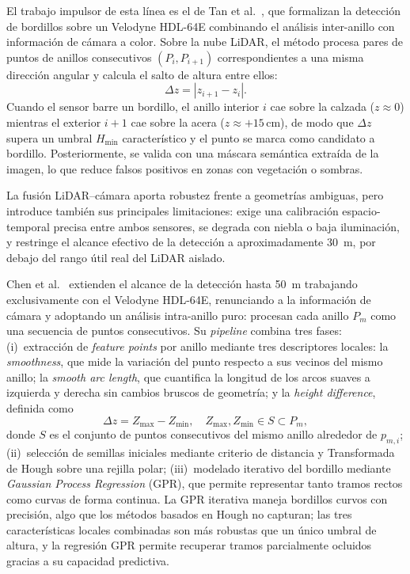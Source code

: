 El trabajo impulsor de esta línea es el de Tan et
al.~\cite{tan2014curb}, que formalizan la detección de bordillos sobre
un Velodyne HDL-64E combinando el análisis inter-anillo con información
de cámara a color. Sobre la nube LiDAR, el método procesa pares de
puntos de anillos consecutivos $(P_i, P_{i+1})$ correspondientes a una
misma dirección angular y calcula el salto de altura entre ellos:
\begin{equation}
    \Delta z = \left| z_{i+1} - z_i \right|.
\end{equation}
Cuando el sensor barre un bordillo, el anillo interior $i$ cae sobre la
calzada ($z \approx 0$) mientras el exterior $i+1$ cae sobre la acera
($z \approx +15$\,cm), de modo que $\Delta z$ supera un umbral
$H_{\min}$ característico y el punto se marca como candidato a bordillo.
Posteriormente, se valida con una máscara semántica extraída de la
imagen, lo que reduce falsos positivos en zonas con vegetación o
sombras.

La fusión LiDAR--cámara aporta robustez frente a geometrías ambiguas,
pero introduce también sus principales limitaciones: exige una
calibración espacio-temporal precisa entre ambos sensores, se degrada
con niebla o baja iluminación, y restringe el alcance efectivo de la
detección a aproximadamente 30~m, por debajo del rango útil real del
LiDAR aislado.

Chen et al.~\cite{chen2015velodyne} extienden el alcance de la
detección hasta 50~m trabajando exclusivamente con el Velodyne HDL-64E,
renunciando a la información de cámara y adoptando un análisis
intra-anillo puro: procesan cada anillo $P_m$ como una secuencia de
puntos consecutivos. Su \textit{pipeline} combina tres fases:
(i)~extracción de \textit{feature points} por anillo mediante tres
descriptores locales: la \textit{smoothness}, que mide la variación del
punto respecto a sus vecinos del mismo anillo; la \textit{smooth arc
length}, que cuantifica la longitud de los arcos suaves a izquierda y
derecha sin cambios bruscos de geometría; y la \textit{height difference},
definida como
\begin{equation}
    \Delta z = Z_{\max} - Z_{\min}, \quad Z_{\max}, Z_{\min} \in S \subset P_m,
\end{equation}
donde $S$ es el conjunto de puntos consecutivos del mismo anillo
alrededor de $p_{m,i}$;
(ii)~selección de semillas iniciales mediante criterio de distancia y
Transformada de Hough sobre una rejilla polar;
(iii)~modelado iterativo del bordillo mediante \textit{Gaussian Process
Regression} (GPR), que permite representar tanto tramos rectos como
curvas de forma continua. La GPR iterativa maneja bordillos curvos con
precisión, algo que los métodos basados en Hough no capturan; las tres
características locales combinadas son más robustas que un único
umbral de altura, y la regresión GPR permite recuperar tramos
parcialmente ocluidos gracias a su capacidad predictiva.

